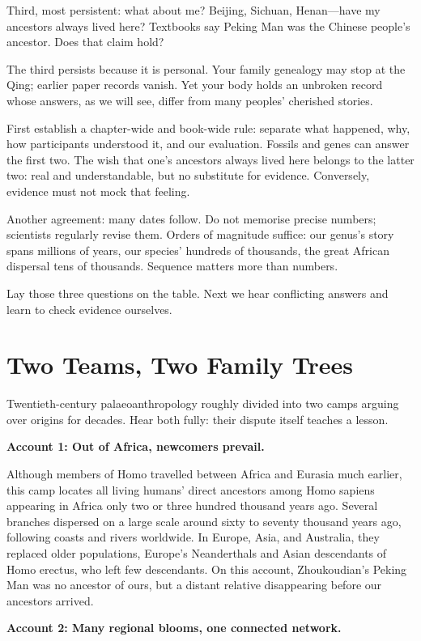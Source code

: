 Third, most persistent: what about me? Beijing, Sichuan, Henan---have my ancestors always lived here? Textbooks say Peking Man was the Chinese people's ancestor. Does that claim hold?

The third persists because it is personal. Your family genealogy may stop at the Qing; earlier paper records vanish. Yet your body holds an unbroken record whose answers, as we will see, differ from many peoples' cherished stories.

First establish a chapter-wide and book-wide rule: separate what happened, why, how participants understood it, and our evaluation. Fossils and genes can answer the first two. The wish that one's ancestors always lived here belongs to the latter two: real and understandable, but no substitute for evidence. Conversely, evidence must not mock that feeling.

Another agreement: many dates follow. Do not memorise precise numbers; scientists regularly revise them. Orders of magnitude suffice: our genus's story spans millions of years, our species' hundreds of thousands, the great African dispersal tens of thousands. Sequence matters more than numbers.

Lay those three questions on the table. Next we hear conflicting answers and learn to check evidence ourselves.

\section{Two Teams, Two Family Trees}
Twentieth-century palaeoanthropology roughly divided into two camps arguing over origins for decades. Hear both fully: their dispute itself teaches a lesson.

\textbf{Account 1: Out of Africa, newcomers prevail.}

Although members of Homo travelled between Africa and Eurasia much earlier, this camp locates all living humans' direct ancestors among Homo sapiens appearing in Africa only two or three hundred thousand years ago. Several branches dispersed on a large scale around sixty to seventy thousand years ago, following coasts and rivers worldwide. In Europe, Asia, and Australia, they replaced older populations, Europe's Neanderthals and Asian descendants of Homo erectus, who left few descendants. On this account, Zhoukoudian's Peking Man was no ancestor of ours, but a distant relative disappearing before our ancestors arrived.

\textbf{Account 2: Many regional blooms, one connected network.}

